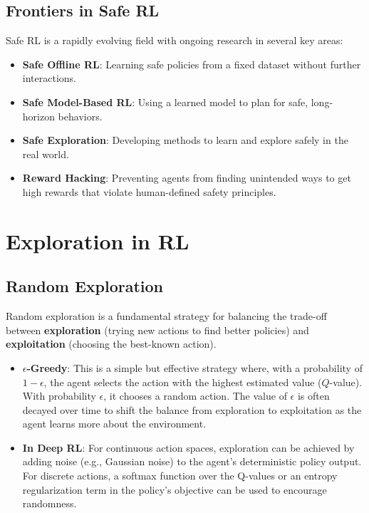 \documentclass[12pt]{article}
\begin{document}
\subsection{Frontiers in Safe RL}
Safe RL is a rapidly evolving field with ongoing research in several key areas:
\begin{itemize}
    \item \textbf{Safe Offline RL}: Learning safe policies from a fixed dataset without further interactions.
    \item \textbf{Safe Model-Based RL}: Using a learned model to plan for safe, long-horizon behaviors.
    \item \textbf{Safe Exploration}: Developing methods to learn and explore safely in the real world.
    \item \textbf{Reward Hacking}: Preventing agents from finding unintended ways to get high rewards that violate human-defined safety principles.
\end{itemize}

\section{Exploration in RL }

\subsection{Random Exploration}
Random exploration is a fundamental strategy for balancing the trade-off between \textbf{exploration} (trying new actions to find better policies) and \textbf{exploitation} (choosing the best-known action).
\begin{itemize}
    \item \textbf{$\epsilon$-Greedy}: This is a simple but effective strategy where, with a probability of $1 - \epsilon$, the agent selects the action with the highest estimated value ($Q$-value). With probability $\epsilon$, it chooses a random action. The value of $\epsilon$ is often decayed over time to shift the balance from exploration to exploitation as the agent learns more about the environment.
    \item \textbf{In Deep RL}: For continuous action spaces, exploration can be achieved by adding noise (e.g., Gaussian noise) to the agent's deterministic policy output. For discrete actions, a softmax function over the Q-values or an entropy regularization term in the policy's objective can be used to encourage randomness.
\end{itemize}
\end{document}
